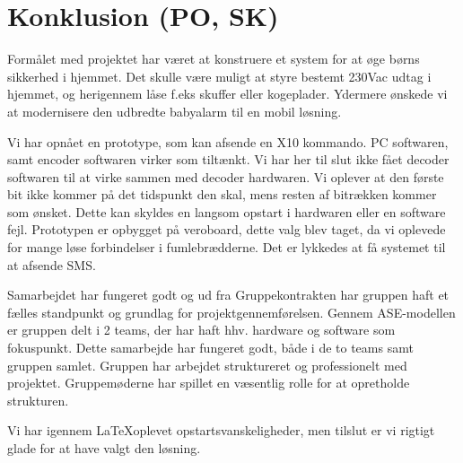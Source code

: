 \chapter{Konklusion (PO, SK)}

Formålet med projektet har været at konstruere et system for at øge børns sikkerhed i hjemmet. Det skulle være muligt at styre bestemt 230Vac udtag i hjemmet, og herigennem låse f.eks skuffer eller kogeplader. Ydermere ønskede vi at modernisere den udbredte babyalarm til en mobil løsning. 

Vi har opnået en prototype, som kan afsende en X10 kommando. PC softwaren, samt encoder softwaren virker som tiltænkt. Vi har her til slut ikke fået decoder softwaren til at virke sammen med decoder hardwaren. Vi oplever at den første bit ikke kommer på det tidspunkt den skal, mens resten af bitrækken kommer som ønsket. Dette kan skyldes en langsom opstart i hardwaren eller en software fejl. Prototypen er opbygget på veroboard, dette valg blev taget, da vi oplevede for mange løse forbindelser i fumlebrædderne. 
Det er lykkedes at få systemet til at afsende SMS.  

Samarbejdet har fungeret godt og ud fra Gruppekontrakten har gruppen haft et fælles standpunkt og grundlag for projektgennemførelsen. Gennem ASE-modellen er gruppen delt i 2 teams, der har haft hhv. hardware og software som fokuspunkt. Dette samarbejde har fungeret godt, både i de to teams samt gruppen samlet. Gruppen har arbejdet struktureret og professionelt med projektet. Gruppemøderne har spillet en væsentlig rolle for at opretholde strukturen.  

Vi har igennem \LaTeX oplevet opstartsvanskeligheder, men tilslut er vi rigtigt glade for at have valgt den løsning. 